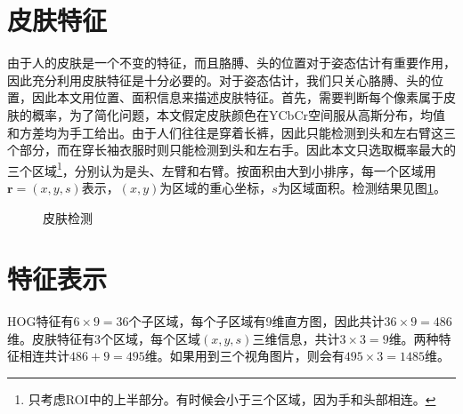 \section{皮肤特征}
由于人的皮肤是一个不变的特征，而且胳膊、头的位置对于姿态估计有重要作用，因此充分利用皮肤特征是十分必要的。对于姿态估计，我们只关心胳膊、头的位置，因此本文用位置、面积信息来描述皮肤特征。首先，需要判断每个像素属于皮肤的概率，为了简化问题，本文假定皮肤颜色在YCbCr空间服从高斯分布，均值和方差均为手工给出。由于人们往往是穿着长裤，因此只能检测到头和左右臂这三个部分，而在穿长袖衣服时则只能检测到头和左右手。因此本文只选取概率最大的三个区域\footnote{只考虑ROI中的上半部分。有时候会小于三个区域，因为手和头部相连。}，分别认为是头、左臂和右臂。按面积由大到小排序，每一个区域用$\mathbf{r}=(x,y,s)$表示，$(x,y)$为区域的重心坐标，$s$为区域面积。检测结果见图\ref{fig:skin}。
\begin{figure}[htbp]
  \centering
  \hspace{1cm}
  \caption{皮肤检测}\label{fig:skin}
\end{figure}

\section{特征表示}
\label{sec:feature}
HOG特征有$6\times 9=36$个子区域，每个子区域有9维直方图，因此共计$36\times 9=486$维。皮肤特征有3个区域，每个区域$(x,y,s)$三维信息，共计$3\times 3=9$维。两种特征相连共计$486+9=495$维。如果用到三个视角图片，则会有$495\times 3=1485$维。
